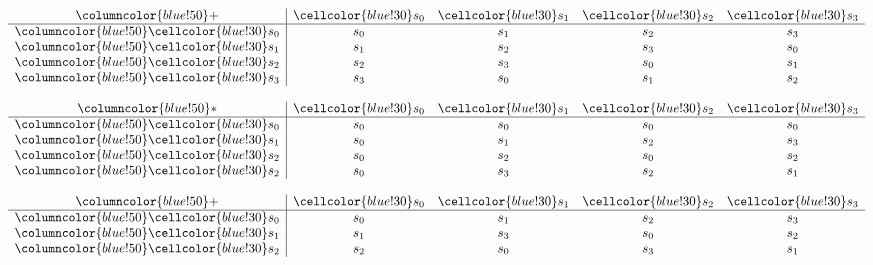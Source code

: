 \documentclass{article}
\begin{document}
\begin{center}
\begin{minipage}{0.23\textwidth}
    \centering
    \renewcommand{\arraystretch}{1.5} 
    \[
    \begin{array}{>{\columncolor{blue!50}}c|cccc}
    + & \cellcolor{blue!30}s_0 & \cellcolor{blue!30}s_1 & \cellcolor{blue!30}s_2 & \cellcolor{blue!30}s_3 \\ \hline
    \cellcolor{blue!30}s_0 & s_0 & s_1 & s_2 & s_3 \\
    \cellcolor{blue!30}s_1 & s_1 & s_2 & s_3 & s_0 \\
    \cellcolor{blue!30}s_2 & s_2 & s_3 & s_0 & s_1 \\
    \cellcolor{blue!30}s_3 & s_3 & s_0 & s_1 & s_2 \\
    \end{array}
    \]
\end{minipage}%
\hfill
\begin{minipage}{0.23\textwidth}
    \centering
    \renewcommand{\arraystretch}{1.5} 
    \[
    \begin{array}{>{\columncolor{blue!50}}c|cccc}
    * & \cellcolor{blue!30}s_0 & \cellcolor{blue!30}s_1 & \cellcolor{blue!30}s_2 & \cellcolor{blue!30}s_3 \\ \hline
    \cellcolor{blue!30}s_0 & s_0 & s_0 & s_0 & s_0 \\
    \cellcolor{blue!30}s_1 & s_0 & s_1 & s_2 & s_3 \\
    \cellcolor{blue!30}s_2 & s_0 & s_2 & s_0 & s_2 \\
    \cellcolor{blue!30}s_2 & s_0 & s_3 & s_2 & s_1 \\
    \end{array}
    \]
\end{minipage}
\hspace{0.75cm}
\begin{minipage}{0.23\textwidth}
    \centering
    \renewcommand{\arraystretch}{1.5} 
    \[
    \begin{array}{>{\columncolor{blue!50}}c|cccc}
    + & \cellcolor{blue!30}s_0 & \cellcolor{blue!30}s_1 & \cellcolor{blue!30}s_2 & \cellcolor{blue!30}s_3 \\ \hline
    \cellcolor{blue!30}s_0 & s_0 & s_1 & s_2 & s_3 \\
    \cellcolor{blue!30}s_1 & s_1 & s_3 & s_0 & s_2 \\
    \cellcolor{blue!30}s_2 & s_2 & s_0 & s_3 & s_1 \\

\end{array}\]
\end{minipage}
\end{center}
\end{document}
